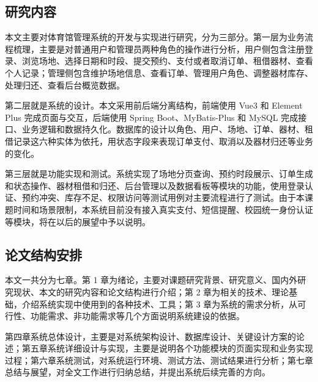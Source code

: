 \subsection{研究内容}

本文主要对体育馆管理系统的开发与实现进行研究，分为三部分。第一层为业务流程梳理，主要是对普通用户和管理员两种角色的操作进行分析，用户侧包含注册登录、浏览场地、选择日期和时段、提交预约、支付或者取消订单、租借器材、查看个人记录；管理侧包含维护场地信息、查看订单、管理用户角色、调整器材库存、处理归还、查看后台概览数据。

第二层就是系统的设计。本文采用前后端分离结构，前端使用 Vue3 和 Element Plus 完成页面与交互，后端使用 Spring Boot、MyBatis-Plus 和 MySQL 完成接口、业务逻辑和数据持久化。数据库的设计以角色、用户、场地、订单、器材、租借记录这六种实体为依托，用状态字段来表现订单支付、取消以及器材归还等业务的变化。

第三层就是功能实现和测试。系统实现了场地分页查询、预约时段展示、订单生成和状态操作、器材租借和归还、后台管理以及数据看板等模块的功能，使用登录认证、预约冲突、库存不足、权限访问等测试用例对主要流程进行了测试。由于本课题时间和场景限制，本系统目前没有接入真实支付、短信提醒、校园统一身份认证等模块，将在以后的展望中予以说明。

\subsection{论文结构安排}

本文一共分为七章。第 1 章为绪论，主要对课题研究背景、研究意义、国内外研究现状、本文的研究内容和论文结构进行介绍；第 2 章为相关的技术、理论基础，介绍系统实现中使用到的各种技术、工具；第 3 章为系统的需求分析，从可行性、功能需求、非功能需求等几个方面说明系统建设的依据。

第四章系统总体设计，主要是对系统架构设计、数据库设计、关键设计方案的论述；第五章系统详细设计与实现，主要是说明各个功能模块的页面实现和业务实现过程；第六章系统测试，对系统运行环境、测试方法、测试结果进行分析；第七章总结与展望，对全文工作进行归纳总结，并提出系统后续完善的方向。
